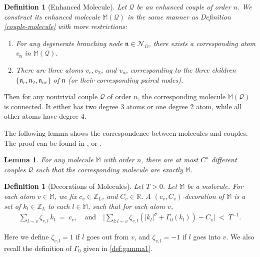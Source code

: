 \documentclass[UTF-8,reqno]{amsart}
\numberwithin{equation}{section}
\newtheorem{lemma}[theorem]{Lemma}
\newtheorem{definition}[theorem]{Definition}
\theoremstyle{definition}
\begin{document}
\begin{definition}[Enhanced Molecule]
Let $\mathcal{Q}$ be an enhanced couple of order $n$. We construct its  enhanced molecule $\mathbb{M}(\mathcal{Q})$ in the same manner as Definition \ref{couple-molecule} with more restrictions:
\begin{enumerate}
    \item For any degenerate branching node $\mathfrak{n}\in\mathcal{N}_D$, there exists a corresponding atom $v_{\mathfrak{n}}$ in  $\mathbb{M}(\mathcal{Q})$.
    \item There are three atoms $v_c,v_2$, and $v_{nc}$ corresponding to the three children $\{\mathfrak{n}_c,\mathfrak{n}_2, \mathfrak{n}_{nc}\}$ of  $\mathfrak{n}$ (or their corresponding paired  nodes).
\end{enumerate}
\end{definition}
Then for any nontrivial couple $\mathcal{Q}$ of order $n$, the corresponding molecule $\mathbb{M}(\mathcal{Q})$ is connected.  It either has two degree 3 atoms or one degree 2
 atom, while all other atoms have degree 4. %

The following lemma shows the correspondence between molecules and couples. The proof can be found in \cite[Proposition 9.6]{DH23a}, or \cite[Proposition 2.12]{Wu25}.
\begin{lemma}
\label{prop:molecules-couples}
 For any molecule $\mathbb{M}$ with order $n$, there are at most $C^n$ different couples $\mathcal{Q}$  such that the corresponding  molecule are exactly $\mathbb{M}$.
\end{lemma}



\begin{definition}[Decorations of Molecules]
\label{def:decorations-molecules}
Let $T>0$. Let $\mathbb{M}$ be a molecule. For each atom $v \in \mathbb{M}$, we fix $c_v \in \mathbb{Z}_L$,  and $C_v \in \mathbb{R}$.
A  $(c_v,C_v)$-decoration of $\mathbb{M}$ is a set of $k_l\in\mathbb{Z}_L $ to each  $l \in \mathbb{M}$, such  that for each atom $v$,
\begin{align*}
\sum_{l \sim v} \zeta_{v,l} \,k_l \;=\; c_v,
\quad\text{and}\quad
\bigl|\sum_{l: l\sim v} \zeta_{v,l} (|k_l|^\sigma+\Gamma_0(k_l)) - C_v\bigr|\;<\;T^{-1}.
\end{align*}
\end{definition}
 Here we define $\zeta_{v,l}=1$ if $l$ goes out from $v$, and $\zeta_{v,l}=-1$ if $l$ goes into $v$. We also recall the definition of $\Gamma_0$ given in \eqref{def:gamma1}.
\end{document}
